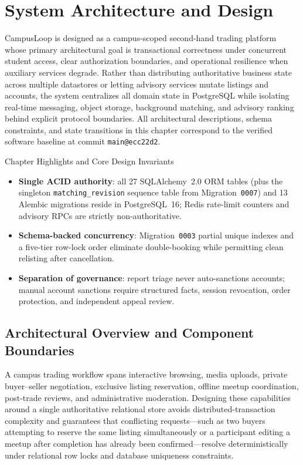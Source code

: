 \chapter{System Architecture and Design}
\label{ch:design}

CampusLoop is designed as a campus-scoped second-hand trading platform whose primary architectural goal is transactional correctness under concurrent student access, clear authorization boundaries, and operational resilience when auxiliary services degrade. Rather than distributing authoritative business state across multiple datastores or letting advisory services mutate listings and accounts, the system centralizes all domain state in PostgreSQL while isolating real-time messaging, object storage, background matching, and advisory ranking behind explicit protocol boundaries. All architectural descriptions, schema constraints, and state transitions in this chapter correspond to the verified software baseline at commit \texttt{main@ecc22d2}.

\begin{clbox}{Chapter Highlights and Core Design Invariants}
  \small
  \begin{itemize}[leftmargin=1.2em,itemsep=1pt,topsep=2pt]
    \item \textbf{Single ACID authority}: all 27 SQLAlchemy~2.0 ORM tables (plus the singleton \texttt{matching\_revision} sequence table from Migration~\texttt{0007}) and 13 Alembic migrations reside in PostgreSQL~16; Redis rate-limit counters and advisory RPCs are strictly non-authoritative.
    \item \textbf{Schema-backed concurrency}: Migration~\texttt{0003} partial unique indexes and a five-tier row-lock order eliminate double-booking while permitting clean relisting after cancellation.
    \item \textbf{Separation of governance}: report triage never auto-sanctions accounts; manual account sanctions require structured facts, session revocation, order protection, and independent appeal review.
  \end{itemize}
\end{clbox}

\section{Architectural Overview and Component Boundaries}
\label{sec:design-architecture}

A campus trading workflow spans interactive browsing, media uploads, private buyer--seller negotiation, exclusive listing reservation, offline meetup coordination, post-trade reviews, and administrative moderation. Designing these capabilities around a single authoritative relational store avoids distributed-transaction complexity and guarantees that conflicting requests---such as two buyers attempting to reserve the same listing simultaneously or a participant editing a meetup after completion has already been confirmed---resolve deterministically under relational row locks and database uniqueness constraints.

